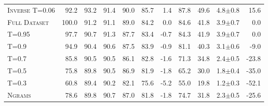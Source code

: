 \begin{table*}[ht]
\begin{tabular}{l | r | cccc | r || ccc | r}
    \textsc{Inverse T=0.06} & 92.2 & 93.2 & 91.4 & 90.0 & 85.7 & \cellcolor{forestgreen!14} 1.4 & 87.8 & 49.6 & 4.8$\pm$0.8 & \cellcolor{forestgreen!50} 15.6 \\
    \textsc{Full Dataset} & 100.0 & 91.2 & 91.1 & 89.0 & 84.2 & 0.0 & 84.6 & 41.8 & 3.9$\pm$0.7 & 0.0 \\
    \textsc{T=0.95} & 97.7 & 90.7 & 91.3 & 87.7 & 83.4 & \cellcolor{color3!7}-0.7 & 84.3 & 41.9 & 3.9$\pm$0.7 & 0.0 \\
    \textsc{T=0.9} & 94.9 & 90.4 & 90.6 & 87.5 & 83.9 & \cellcolor{color3!10}-0.9 & 81.1 & 40.3 & 3.1$\pm$0.6 & \cellcolor{color3!28}-9.0 \\
    \textsc{T=0.7} & 85.8 & 90.5 & 90.5 & 86.1 & 82.8 & \cellcolor{color3!16}-1.6 & 71.3 & 34.8 & 2.4$\pm$0.5 & \cellcolor{color3!47}-23.8 \\
    \textsc{T=0.5} & 75.8 & 89.8 & 90.5 & 86.9 & 81.9 & \cellcolor{color3!18}-1.8 & 65.2 & 30.0 & 1.8$\pm$0.4 & \cellcolor{color3!70}-35.0 \\
    \textsc{T=0.3} & 60.8 & 89.4 & 90.2 & 82.1 & 75.6 & \cellcolor{color3!25}-5.2 & 55.0 & 19.8 & 1.2$\pm$0.3 & \cellcolor{color3!80}-52.1 \\
    \textsc{Ngrams} & 78.6 & 89.8 & 90.7 & 87.0 & 81.8 & \cellcolor{color3!18}-1.8 & 74.7 & 31.8 & 2.3$\pm$0.5 & \cellcolor{color3!51}-25.6 \\

    \bottomrule
    \end{tabular}

\end{table*}
\endgroup

